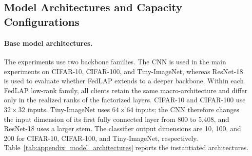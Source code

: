 \subsection{Model Architectures and Capacity Configurations}
\label{app:model_capacity}

\paragraph{Base model architectures.}
The experiments use two backbone families.  The CNN is used in the main
experiments on CIFAR-10, CIFAR-100, and Tiny-ImageNet, whereas ResNet-18 is
used to evaluate whether FedLAP extends to a deeper backbone.  Within each
FedLAP low-rank family, all clients retain the same macro-architecture and
differ only in the realized ranks of the factorized layers.  CIFAR-10 and
CIFAR-100 use $32\times32$ inputs.  Tiny-ImageNet uses $64\times64$ inputs;
the CNN therefore changes the input dimension of its first fully connected
layer from 800 to 5,408, and ResNet-18 uses a larger stem.  The classifier
output dimensions are 10, 100, and 200 for CIFAR-10, CIFAR-100, and
Tiny-ImageNet, respectively.  Table~\ref{tab:appendix_model_architectures}
reports the instantiated architectures.

